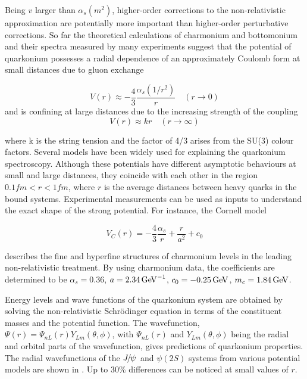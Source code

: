 \noindent Being $v$ larger than $\alpha_s(m^2)$, higher-order corrections to the 
non-relativistic approximation are potentially more important than higher-order
perturbative corrections. So far the theoretical calculations of charmonium and
bottomonium and their spectra measured by many experiments suggest that the
potential of quarkonium possesses a radial dependence of an approximately
Coulomb form at small distances due to gluon exchange

\begin{equation}
V(r) \approx -{\frac{4}{3}}{\frac{\alpha_s(1/r^2)}{r}} \quad (r\rightarrow 0)
\end{equation}
\noindent and is confining at large distances due to the increasing strength 
of the coupling
\begin{equation}
V(r) \approx kr \quad (r\rightarrow \infty)
\end{equation}

\noindent where k is the string tension and the factor of 4/3 arises from the
SU(3) colour factors. Several models have been widely used for explaining the
quarkonium spectroscopy. Although these potentials have different asymptotic
behaviours at small and large distances, they coincide with each other in the
region $0.1 fm < r <1 fm$, where $r$ is the average distances between heavy quarks
in the bound systems. Experimental measurements can be used as inputs to
understand the exact shape of the strong potential. For instance, the Cornell
model

\begin{equation}
V_C(r) = -{\frac{4}{3}}{\frac{\alpha_s}{r}} + {\frac{r}{a^2}} + c_0
\end{equation}  

\noindent describes the fine and hyperfine structures of charmonium levels in the leading
non-relativistic treatment. By using charmonium data, the coefficients are
determined to be $\alpha_s = 0.36$, $a=2.34 \mathrm{\,Ge\kern -0.1em V}^{-1}$, $c_0 = -0.25 \mathrm{\,Ge\kern -0.1em V}$, $m_c
= 1.84\mathrm{\,Ge\kern -0.1em V}$.

Energy levels and wave functions of the quarkonium system are obtained by solving 
the non-relativistic Schr\"odinger equation in terms of the constituent masses and the 
potential function. The wavefunction, $\Psi(r) = \Psi_{nL}(r)Y_{Lm}(\theta,\phi)$, with 
$\Psi_{nL}(r)$ and $Y_{Lm}(\theta,\phi)$ being the radial and orbital parts of the wavefunction, 
gives predictions of quarkonium properties. The radial wavefunctions of the ${{J\mskip -3mu/\mskip -2mu\psi\mskip 2mu}}$ and 
$\psi(2S)$ systems from various potential models are shown in . 
Up to 30\% differences can be noticed at small values of $r$. 


